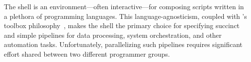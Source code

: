 \documentclass[letterpaper,twocolumn,10pt]{article}
\newcommand{\kk}[1]{[{\color{magenta}kk: #1}]}
\begin{document}


%
% 
% 

The \unix shell is an environment---often interactive---for composing scripts written in a plethora of programming languages.
This language-agnosticism, coupled with \unix's toolbox philosophy~\cite{mcilroy1978unix}, makes the shell the primary choice for specifying succinct and simple pipelines for data processing, system orchestration, and other automation tasks.
Unfortunately, parallelizing such pipelines requires significant effort shared between two different programmer groups. %
\end{document}

